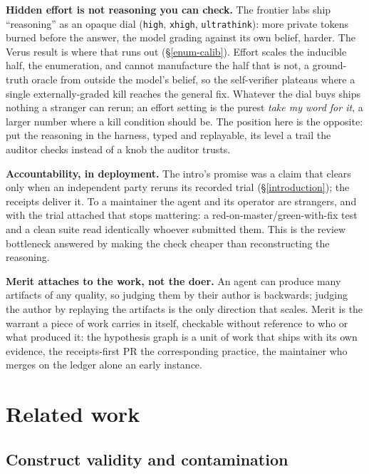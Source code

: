 \documentclass[
  10pt,
]{article}
\begin{document}
\textbf{Hidden effort is not reasoning you can check.} The frontier labs
ship ``reasoning'' as an opaque dial (\texttt{high}, \texttt{xhigh},
\texttt{ultrathink}): more private tokens burned before the answer, the
model grading against its own belief, harder. The Verus result is where
that runs out (\S\ref{enum-calib}). Effort scales the inducible half,
the enumeration, and cannot manufacture the half that is not, a
ground-truth oracle from outside the model's belief, so the
self-verifier plateaus where a single externally-graded kill reaches the
general fix. Whatever the dial buys ships nothing a stranger can rerun;
an effort setting is the purest \emph{take my word for it}, a larger
number where a kill condition should be. The position here is the
opposite: put the reasoning in the harness, typed and replayable, its
level a trail the auditor checks instead of a knob the auditor trusts.

\textbf{Accountability, in deployment.} The intro's promise was a claim
that clears only when an independent party reruns its recorded trial
(\S\ref{introduction}); the receipts deliver it. To a maintainer the
agent and its operator are strangers, and with the trial attached that
stops mattering: a red-on-master/green-with-fix test and a clean suite
read identically whoever submitted them. This is the review bottleneck
answered by making the check cheaper than reconstructing the reasoning.

\textbf{Merit attaches to the work, not the doer.} An agent can produce
many artifacts of any quality, so judging them by their author is
backwards; judging the author by replaying the artifacts is the only
direction that scales. Merit is the warrant a piece of work carries in
itself, checkable without reference to who or what produced it: the
hypothesis graph is a unit of work that ships with its own evidence, the
receipts-first PR the corresponding practice, the maintainer who merges
on the ledger alone an early instance.

\section{Related work}\label{related-work}

\subsection{Construct validity and contamination}\label{rw-swebench}
\end{document}
